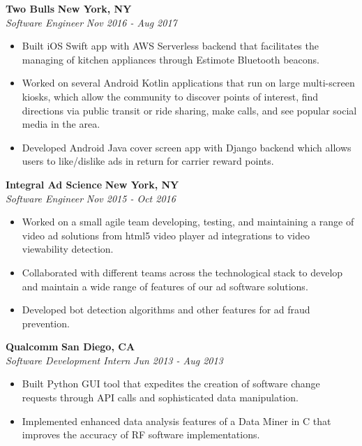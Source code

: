 \documentclass{res}
\begin{document}
\begin{resume}
{\bf Two Bulls} \hfill {\bf New York, NY} \\
{\textit {Software Engineer}} \hfill {\textit {Nov 2016 - Aug 2017}} 
\begin{itemize}
\renewcommand{\labelitemi}{\ding{117}}
\itemsep -2pt  
\item Built iOS Swift app with AWS Serverless backend that facilitates the managing of kitchen appliances through Estimote Bluetooth beacons. 
\item Worked on several Android Kotlin applications that run on large multi-screen kiosks, which allow the community to discover points of interest, find directions via public transit or ride sharing, make calls, and see popular social media in the area. 
\item Developed Android Java cover screen app with Django backend which allows users to like/dislike ads in return for carrier reward points.

\end{itemize}

{\bf Integral Ad Science} \hfill {\bf New York, NY} \\
{\textit {Software Engineer}} \hfill {\textit {Nov 2015 - Oct 2016}} 
\begin{itemize}
\renewcommand{\labelitemi}{\ding{117}}
\itemsep -2pt  
\item Worked on a small agile team developing, testing, and maintaining a range of video ad solutions from html5 video player ad integrations to video viewability detection.
\item Collaborated with different teams across the technological stack to develop and maintain a wide range of features of our ad software solutions.
\item Developed bot detection algorithms and other features for ad fraud prevention.

\end{itemize}

{\bf Qualcomm} \hfill {\bf San Diego, CA} \\
{\textit {Software Development Intern}} \hfill {\textit {Jun 2013 - Aug 2013}} 
\begin{itemize} 
\renewcommand{\labelitemi}{\ding{117}}
\itemsep -2pt  
\item Built Python GUI tool that expedites the creation of software 
	change requests through API calls and sophisticated data manipulation.
\item Implemented enhanced data analysis features of a Data Miner in C that
	 improves the accuracy of RF software implementations.
\end{itemize}


\end{resume}
\end{document}
